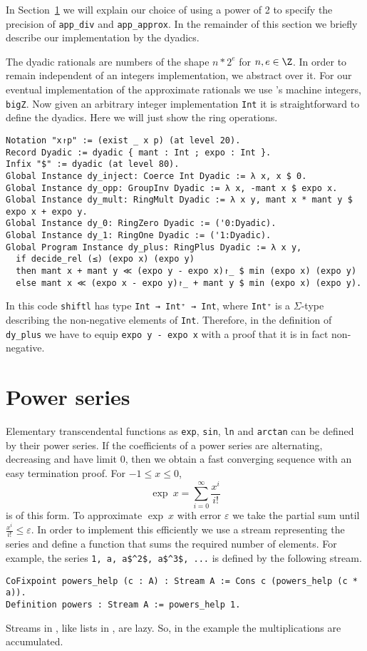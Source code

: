 \documentclass[a4paper,10pt,runningheads]{llncs}
\begin{document}
In Section~\ref{section:series} we will explain our choice of using a power of 2 to specify the precision of \lstinline|app_div| and \lstinline|app_approx|. In the remainder of this section we briefly describe our implementation by the dyadics.

The dyadic rationals are numbers of the shape $n * 2 ^ e$ for $n,e \in \Z$. In order to remain independent of an integers implementation, we abstract over it. For our eventual implementation of the approximate rationals we use \Coq's machine integers, \lstinline|bigZ|. Now given an arbitrary integer implementation \lstinline|Int| it is straightforward to define the dyadics. Here we will just show the ring operations.
\begin{lstlisting}[mathescape=false,breaklines=false]
Notation "x↾p" := (exist _ x p) (at level 20).
Record Dyadic := dyadic { mant : Int ; expo : Int }.
Infix "$" := dyadic (at level 80).
Global Instance dy_inject: Coerce Int Dyadic := λ x, x $ 0.
Global Instance dy_opp: GroupInv Dyadic := λ x, -mant x $ expo x.
Global Instance dy_mult: RingMult Dyadic := λ x y, mant x * mant y $ expo x + expo y.
Global Instance dy_0: RingZero Dyadic := ('0:Dyadic).
Global Instance dy_1: RingOne Dyadic := ('1:Dyadic).
Global Program Instance dy_plus: RingPlus Dyadic := λ x y, 
  if decide_rel (≤) (expo x) (expo y)
  then mant x + mant y ≪ (expo y - expo x)↾_ $ min (expo x) (expo y)
  else mant x ≪ (expo x - expo y)↾_ + mant y $ min (expo x) (expo y).
\end{lstlisting}
In this code \lstinline|shiftl| has type \lstinline|Int → Int⁺ → Int|, where \lstinline|Int⁺| is a $\Sigma$-type describing the non-negative elements of \lstinline|Int|. Therefore, in the definition of \lstinline|dy_plus| we have to equip \lstinline|expo y - expo x| with a proof that it is in fact non-negative.

\section{Power series}\label{section:series}
Elementary transcendental functions as \lstinline|exp|, \lstinline|sin|, \lstinline|ln| and \lstinline|arctan| can be defined by their power series. If the coefficients of a power series are alternating, decreasing and have limit 0, then we obtain a fast converging sequence with an easy termination proof. For $-1 ≤ x ≤ 0$,
\[
	\exp\ x = \sum_{i=0}^\infty \frac {x^i} {i!}
\]
is of this form. To approximate $\exp\ x$ with error $ε$ we take the partial sum until $\frac{x^i}{i!} ≤ ε$.
In order to implement this efficiently we use a stream representing the series and define a function that sums the required number of elements. For example, the series \lstinline|1, a, a$^2$, a$^3$, ...| is defined by the following stream.
\begin{lstlisting}
CoFixpoint powers_help (c : A) : Stream A := Cons c (powers_help (c * a)).
Definition powers : Stream A := powers_help 1.
\end{lstlisting}
Streams in \Coq, like lists in \Haskell, are lazy. So, in the example the multiplications are accumulated.
\end{document}
